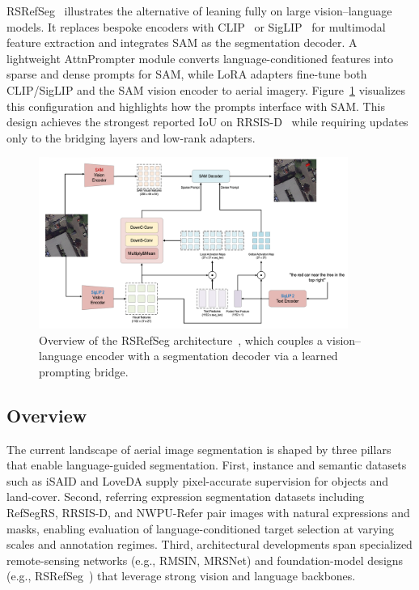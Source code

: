 \documentclass[journal]{IEEEtran}
\begin{document}
RSRefSeg~\cite{chen2025rsrefseg} illustrates the alternative of leaning fully on large vision--language models. It replaces bespoke encoders with CLIP~\cite{clip} or SigLIP~\cite{siglip} for multimodal feature extraction and integrates SAM as the segmentation decoder. A lightweight AttnPrompter module converts language-conditioned features into sparse and dense prompts for SAM, while LoRA adapters fine-tune both CLIP/SigLIP and the SAM vision encoder to aerial imagery. Figure~\ref{fig:rsrefseg_arch} visualizes this configuration and highlights how the prompts interface with SAM. This design achieves the strongest reported IoU on RRSIS-D~\cite{liu2024rotated,chen2025rsrefseg} while requiring updates only to the bridging layers and low-rank adapters.
\begin{figure}[t]
\centering
\includegraphics[width=0.9\textwidth]{./images/rsrefseg.png}
\caption{Overview of the RSRefSeg architecture~\cite{chen2025rsrefseg}, which couples a vision--language encoder with a segmentation decoder via a learned prompting bridge.}
\label{fig:rsrefseg_arch}
\end{figure}

\subsection{Overview}

The current landscape of aerial image segmentation is shaped by three pillars that enable language-guided segmentation. First, instance and semantic datasets such as iSAID and LoveDA supply pixel-accurate supervision for objects and land-cover. Second, referring expression segmentation datasets including RefSegRS, RRSIS-D, and NWPU-Refer pair images with natural expressions and masks, enabling evaluation of language-conditioned target selection at varying scales and annotation regimes. Third, architectural developments span specialized remote-sensing networks (e.g., RMSIN, MRSNet) and foundation-model designs (e.g., RSRefSeg~\cite{chen2025rsrefseg}) that leverage strong vision and language backbones.
\end{document}
